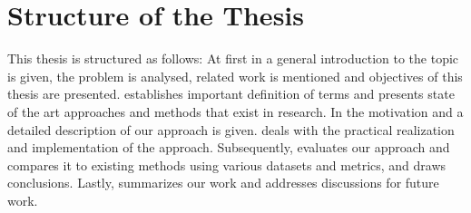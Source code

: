\section{Structure of the Thesis}
\label{sec:structure_of_thesis}

This thesis is structured as follows:
At first in \textbf{} a general introduction to the topic is given, the problem is analysed, related work is mentioned and objectives of this thesis are presented.
\textbf{} establishes important definition of terms and presents state of the art approaches and methods that exist in research.
In \textbf{} the motivation and a detailed description of our approach is given.
\textbf{} deals with the practical realization and implementation of the approach.
Subsequently, \textbf{} evaluates our approach and compares it to existing methods using various datasets and metrics, and draws conclusions.
Lastly, \textbf{} summarizes our work and addresses discussions for future work.